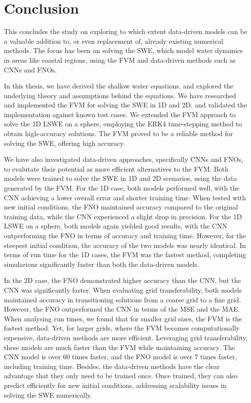\chapter{Conclusion}\label{ch:conclusion}
This concludes the study on exploring to which extent data-driven models can be a valuable addition to, or even replacement of, already existing numerical methods.
The focus has been on solving the SWE, which model water dynamics in areas like coastal regions, using the FVM and data-driven methods such as CNNs and FNOs.

In this thesis, we have derived the shallow water equations, and explored the underlying theory and assumptions behind the equations.
We have researched and implemented the FVM for solving the SWE in 1D and 2D, and validated the implementation against known test cases.
We extended the FVM approach to solve the 1D LSWE on a sphere, employing the ERK4 time-stepping method to obtain high-accuracy solutions.
The FVM proved to be a reliable method for solving the SWE, offering high accuracy.

We have also investigated data-driven approaches, specifically CNNs and FNOs, to evalutate their potential as more efficient alternatives to the FVM.
Both models were trained to solve the SWE in 1D and 2D scenarios, using the data generated by the FVM.
For the 1D case, both models performed well, with the CNN achieving a lower overall error and shorter training time.
When tested with new initial conditions, the FNO maintained accuracy compared to the original training data, while the CNN experienced a slight drop in precision.
For the 1D LSWE on a sphere, both models again yielded good results, with the CNN outperforming the FNO in terms of accuracy and training time.
However, for the steepest initial condition, the accuracy of the two models was nearly identical.
In terms of run time for the 1D cases, the FVM was the fastest method, completing simularions significantly faster than both the data-driven models.

In the 2D case, the FNO demonstrated higher accuracy than the CNN, but the CNN was significantly faster.
When evaluating grid transferability, both models maintained accuracy in transitioning solutions from a coarse grid to a fine grid.
However, the FNO outperformed the CNN in terms of the MSE and the MAE.
When analysing run times, we found that for smaller grid sizes, the FVM is the fastest method.
Yet, for larger grids, where the FVM becomes computationally expensive, data-driven methods are more efficient.
Leveraging grid transferability, these models are much faster than the FVM while maintaining accuracy.
The CNN model is over 60 times faster, and the FNO model is over 7 times faster, including training time.
Besides, the data-driven methods have the clear advantage that they only need to be trained once.
Once trained, they can also predict efficiently for new initial conditions, addressing scalability issues in solving the SWE numerically.

